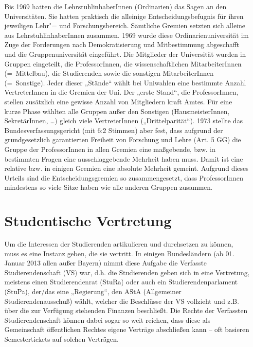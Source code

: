 Bis 1969 hatten die LehrstuhlinhaberInnen (Ordinarien) das Sagen an den Universitäten. Sie hatten praktisch die alleinige Entscheidungsbefugnis für ihren jeweiligen Lehr"= und Forschungsbereich. Sämtliche Gremien setzten sich alleine aus LehrstuhlinhaberInnen zusammen. 1969 wurde diese Ordinarienuniversität im Zuge der Forderungen nach Demokratisierung und Mitbestimmung abgeschafft und die Gruppenuniversität eingeführt. Die Mitglieder der Universität wurden in Gruppen eingeteilt, die ProfessorInnen, die wissenschaftlichen MitarbeiterInnen (=\ Mittelbau), die Studierenden sowie die sonstigen MitarbeiterInnen (=\ Sonstige). Jeder dieser „Stände“ wählt bei Uniwahlen eine bestimmte Anzahl VertreterInnen in die Gremien der Uni. Der „erste Stand“, die ProfessorInnen, stellen zusätzlich eine gewisse Anzahl von Mitgliedern kraft Amtes. Für eine kurze Phase wählten alle Gruppen außer den Sonstigen (HausmeisterInnen, SekretärInnen, \dots) gleich viele VertreterInnen („Drittelparität“). 1973 stellte das Bundesverfassungsgericht (mit 6:2 Stimmen) aber fest, dass aufgrund der grundgesetzlich garantierten Freiheit von Forschung und Lehre (Art. 5 GG) die Gruppe der ProfessorInnen in allen Gremien eine maßgebende, bzw. in bestimmten Fragen eine ausschlaggebende Mehrheit haben muss. Damit ist eine relative bzw. in einigen Gremien eine absolute Mehrheit gemeint. Aufgrund dieses Urteils sind die Entscheidungsgremien so zusammengesetzt, dass ProfessorInnen mindestens so viele Sitze haben wie alle anderen Gruppen zusammen.

\section{Studentische Vertretung}
Um die Interessen der Studierenden artikulieren und durchsetzen zu können, muss es eine Instanz geben, die sie vertritt. In einigen Bundesländern (ab 01. Januar 2013 allen außer Bayern) nimmt diese Aufgabe die Verfasste Studierendenschaft (VS) war, d.h. die Studierenden geben sich in eine Vertretung, meistens einen Studierendenrat (StuRa) oder auch ein Studierendenparlament (StuPa), der/das eine „Regierung“, den AStA (Allgemeiner Studierendenausschuß) wählt, welcher die Beschlüsse der VS vollzieht und z.B. über die zur Verfügung stehenden Finanzen beschließt. Die Rechte der Verfassten Studierendenschaft können dabei sogar so weit reichen, dass diese als Gemeinschaft öffentlichen Rechtes eigene Verträge abschließen kann -- oft basieren Semestertickets auf solchen Verträgen.


